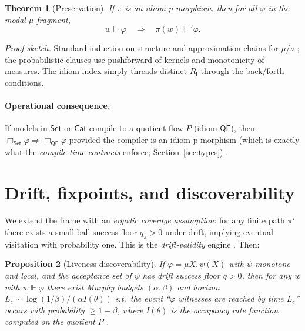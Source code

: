 \documentclass[11pt]{article}
\theoremstyle{plain}
\newtheorem{theorem}{Theorem}
\newtheorem{proposition}[theorem]{Proposition}
\theoremstyle{definition}
\theoremstyle{remark}
\newcommand{\1}{\mathbbm{1}}
\begin{document}
\begin{theorem}[Preservation]\label{thm:preservation}
If $\pi$ is an idiom p-morphism, then for all $\varphi$ in the modal $\mu$-fragment,
\[
w \Vdash \varphi \quad\Longrightarrow\quad \pi(w) \Vdash' \varphi.
\]
\end{theorem}

\noindent\emph{Proof sketch.} Standard induction on structure and approximation chains for $\mu$/$\nu$ \parencite{Kozen1983,BlackburnRijkeVenema2001}; the probabilistic clauses use pushforward of kernels and monotonicity of measures. The idiom index simply threads distinct $R_{\mathsf{I}}$ through the back/forth conditions.

\paragraph{Operational consequence.} If models in $\mathsf{Set}$ or $\mathsf{Cat}$ compile to a quotient flow $P$ (idiom $\mathsf{QF}$), then $\Box_{\mathsf{Set}}\varphi \Rightarrow \Box_{\mathsf{QF}}\varphi$ provided the compiler is an idiom p-morphism (which is exactly what the \emph{compile-time contracts} enforce; Section~\ref{sec:types}) \parencite{elliott2025contracts,elliott2025graded,elliott2025qfi}.

\section{Drift, fixpoints, and discoverability}\label{sec:drift}
We extend the frame with an \emph{ergodic coverage assumption}: for any finite path $\pi^\star$ there exists a small-ball success floor $q_\pi>0$ under drift, implying eventual visitation with probability one. This is the \emph{drift-validity} engine \parencite{elliott2025drift,MeynTweedie2009,KochenStone1964,Freedman1975}. Then:

\begin{proposition}[Liveness discoverability]
If $\varphi=\mu X.\,\psi(X)$ with $\psi$ monotone and local, and the acceptance set of $\psi$ has drift success floor $q>0$, then for any $w$ with $w\Vdash\varphi$ there exist Murphy budgets $(\alpha,\beta)$ and horizon $L_c\sim \log(1/\beta)/(\alpha I(\theta))$ s.t.\ the event “$\varphi$ witnesses are reached by time $L_c$” occurs with probability $\ge 1-\beta$, where $I(\theta)$ is the occupancy rate function computed on the quotient $P$ \parencite{elliott2025qfi,DemboZeitouni1998,elliott2025pmb}.
\end{proposition}
\end{document}
